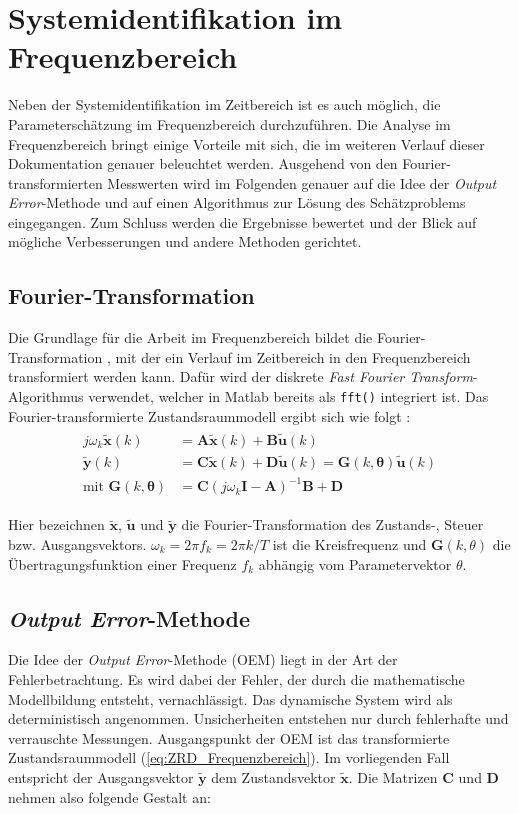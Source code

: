\chapter{Systemidentifikation im Frequenzbereich}
Neben der Systemidentifikation im Zeitbereich ist es auch möglich, die 
Parameterschätzung im Frequenzbereich durchzuführen. 
Die Analyse im Frequenzbereich bringt einige Vorteile mit sich, die im weiteren Verlauf dieser Dokumentation genauer 
beleuchtet werden.  Ausgehend von den Fourier-transformierten Messwerten wird im Folgenden genauer auf die Idee der 
\textit{Output Error}-Methode und auf einen Algorithmus zur Lösung des 
Schätzproblems eingegangen. Zum Schluss werden die 
Ergebnisse  bewertet und der Blick auf mögliche Verbesserungen und andere Methoden gerichtet.


\section{Fourier-Transformation}  
Die Grundlage für die Arbeit im Frequenzbereich bildet die Fourier-Transformation \cite{Bendat1986}, mit der ein Verlauf im 
Zeitbereich in den Frequenzbereich transformiert werden kann. Dafür wird der diskrete \textit{Fast Fourier 
Transform}-Algorithmus verwendet, welcher in Matlab bereits als \texttt{fft()} integriert ist. Das Fourier-transformierte 
Zustandsraummodell ergibt sich wie folgt \cite{Klein2006}:
\begin{align}
	\begin{split}
		j\omega_{k}\mathbf{\tilde{x}}(k)  &= \mathbf{A\tilde{x}}(k) + \mathbf{B\tilde{u}}(k)  \\
		\mathbf{\tilde{y}}(k)             &= \mathbf{C\tilde{x}}(k) + \mathbf{D\tilde{u}}(k) = 
		\mathbf{G}(k,\mathbf{\theta})\mathbf{\tilde{u}}(k)  \\
		\text{mit }\mathbf{G}(k,\mathbf{\theta}) &= \mathbf{C}(j\omega_k\mathbf{I}-\mathbf{A})^{-1}\mathbf{B}+\mathbf{D}
		\label{eq:ZRD_Frequenzbereich}
	\end{split}
\end{align}

Hier bezeichnen $ \mathbf{\tilde{x}} $, $ \mathbf{\tilde{u}} $ und $ \mathbf{\tilde{y}} $ die Fourier-Transformation des 
Zustands-, Steuer bzw. Ausgangsvektors. $ \omega_k=2\pi f_k=2\pi k/T $ ist die Kreisfrequenz und $ \mathbf{G}(k,\theta) $ die 
Übertragungsfunktion einer Frequenz $ f_k $ abhängig vom Parametervektor $ \theta $.


\section{\textit{Output Error}-Methode}
Die Idee der \textit{Output Error}-Methode (OEM) liegt in der Art der Fehlerbetrachtung. Es wird dabei der Fehler, der durch 
die mathematische Modellbildung entsteht, vernachlässigt. Das dynamische System wird als deterministisch angenommen. 
Unsicherheiten entstehen nur durch fehlerhafte und verrauschte Messungen. Ausgangspunkt der OEM ist das transformierte 
Zustandsraummodell (\ref{eq:ZRD_Frequenzbereich}). Im vorliegenden Fall entspricht der Ausgangsvektor $\mathbf{\tilde{y}}$ 
dem Zustandsvektor $\mathbf{\tilde{x}}$. Die Matrizen $\mathbf{C}$ und $\mathbf{D}$ nehmen also folgende Gestalt an:

